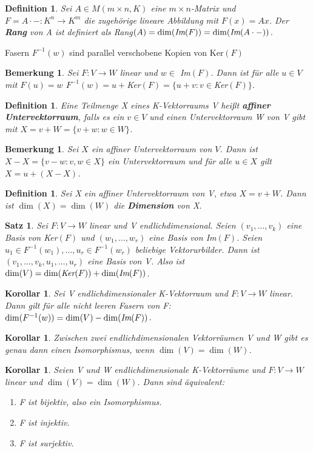 \documentclass[12pt,a4paper]{article}
\theoremstyle{plain}
\newtheorem{Satz}[Theorem]{Satz}
\newtheorem{Korollar}[Theorem]{Korollar}
\newtheorem{Definition}[Theorem]{Definition}
\newtheorem{Bemerkung}[Theorem]{Bemerkung}
\newcommand{\herv}[1]{{\emph{\textbf{#1}}}}
\numberwithin{equation}{section}
\begin{document}
\begin{Definition}
Sei $A\in M(m\times n, K)$ eine $m\times n$-Matrix und $F=A\cdot -: K^n\rightarrow K^m$ die zugehörige lineare Abbildung mit $F(x)=A x$. Der \herv{Rang} von A ist definiert als \emph{Rang}$(A)=\dim(\emph{Im}(F))=\dim(\emph{Im}(A\cdot -))$.
\end{Definition}
\glqq Fasern $F^{-1}(w)$ sind parallel verschobene Kopien von Ker$(F)$\grqq
\begin{Bemerkung}
Sei $F:V\rightarrow W$ linear und $w\in$ Im$(F)$. Dann ist für alle $u \in V$ mit $F(u)=w$ $F^{-1}(w)=u+$Ker$(F)=\{u+v: v \in $Ker$(F)\}$.
\end{Bemerkung}
\begin{Definition}
Eine Teilmenge X eines K-Vektorraums V heißt \herv{affiner Untervektorraum}, falls es ein $v\in V$ und einen Untervektorraum W von V gibt mit $X=v+W=\{v+w: w\in W\}$.
\end{Definition}
\begin{Bemerkung}
Sei $X$ ein affiner Untervektorraum von $V$. Dann ist $X-X=\{v-w: v,w\in X\}$ ein Untervektorraum und für alle $u\in X$ gilt $X=u+(X-X)$.
\end{Bemerkung}
\begin{Definition}
Sei X ein affiner Untervektorraum von V, etwa $X=v+W$. Dann ist $\dim(X)=\dim(W)$ die \herv{Dimension} von X.
\end{Definition}
\begin{Satz}
Sei $F: V \rightarrow W$ linear und V endlichdimensional. Seien $(v_1,\ldots,v_k)$ eine Basis von \emph{Ker}$(F)$ und $(w_1,\ldots,w_r)$ eine Basis von \emph{Im}$(F)$. Seien $u_1\in F^{-1}(w_1),\ldots,u_r\in F^{-1}(w_r)$ beliebige Vektorurbilder. Dann ist $(v_1,\ldots,v_k,u_1,\ldots,u_r)$ eine Basis von V. Also ist $\dim(V)=\dim(\emph{Ker}(F))+\dim(\emph{Im}(F))$.
\end{Satz}
\begin{Korollar}
Sei V endlichdimensionaler K-Vektorraum und $F:V\rightarrow W$ linear. Dann gilt für alle nicht leeren Fasern von F: $\dim(F^{-1}(w))=\dim(V)-\dim(\emph{Im}(F))$.
\end{Korollar}
\begin{Korollar}
Zwischen zwei endlichdimensionalen Vektorräumen V und W gibt es genau dann einen Isomorphismus, wenn $\dim(V)=\dim(W)$.
\end{Korollar}
\begin{Korollar}
Seien V und W endlichdimensionale K-Vektorräume und $F: V\rightarrow W$ linear und $\dim(V)=\dim(W)$. Dann sind äquivalent:
\begin{enumerate}
\renewcommand{\labelenumi}{\emph{(\roman{enumi})}}
\item F ist bijektiv, also ein Isomorphismus.
\item F ist injektiv.
\item F ist surjektiv.
\end{enumerate}
\end{Korollar}
\end{document}
